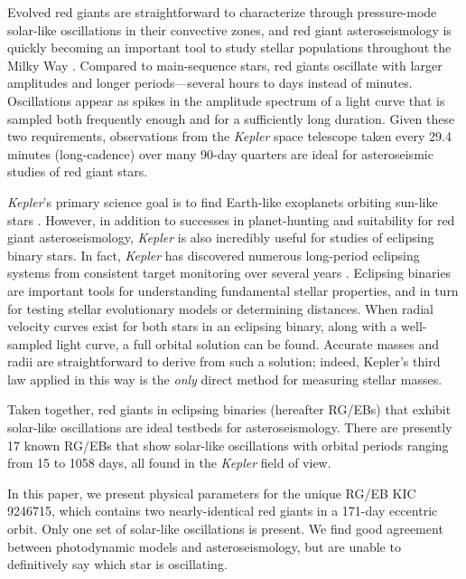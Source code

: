 Evolved red giants are straightforward to characterize through pressure-mode solar-like oscillations in their convective zones, and red giant asteroseismology is quickly becoming an important tool to study stellar populations throughout the Milky Way \citep[for a review of this topic, see][]{cha13}. Compared to main-sequence stars, red giants oscillate with larger amplitudes and longer periods---several hours to days instead of minutes. Oscillations appear as spikes in the amplitude spectrum of a light curve that is sampled both frequently enough and for a sufficiently long duration. Given these two requirements, observations from the \emph{Kepler} space telescope taken every 29.4 minutes (long-cadence) over many 90-day quarters are ideal for asteroseismic studies of red giant stars.

\emph{Kepler}'s primary science goal is to find Earth-like exoplanets orbiting sun-like stars \citep{bor10}. However, in addition to successes in planet-hunting and suitability for red giant asteroseismology, \emph{Kepler} is also incredibly useful for studies of eclipsing binary stars. In fact, \emph{Kepler} has discovered numerous long-period eclipsing systems from consistent target monitoring over several years \citep{prs11,sla11}. Eclipsing binaries are important tools for understanding fundamental stellar properties, and in turn for testing stellar evolutionary models or determining distances. When radial velocity curves exist for both stars in an eclipsing binary, along with a well-sampled light curve, a full orbital solution can be found. Accurate masses and radii are straightforward to derive from such a solution; indeed, Kepler's third law applied in this way is the \emph{only} direct method for measuring stellar masses.

Taken together, red giants in eclipsing binaries (hereafter RG/EBs) that exhibit solar-like oscillations are ideal testbeds for asteroseismology. There are presently 17 known RG/EBs that show solar-like oscillations \citep{hek10,gau13,gau14,bec14} with orbital periods ranging from 15 to 1058 days, all found in the \emph{Kepler} field of view.

In this paper, we present physical parameters for the unique RG/EB KIC 9246715, which contains two nearly-identical red giants in a 171-day eccentric orbit. Only one set of solar-like oscillations is present. We find good agreement between photodynamic models and asteroseismology, but are unable to definitively say which star is oscillating. %

